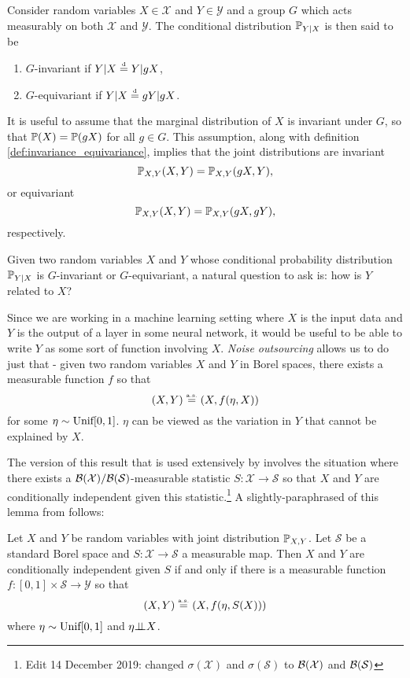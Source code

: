 \begin{definition} \label{def:invariance_equivariance}
Consider random variables $X \in \mathcal{X}$ and $Y \in \mathcal{Y}$ and a group $G$ which acts measurably on both $\mathcal{X}$ and $\mathcal{Y}$.
The conditional distribution $\mathbb{P}_{Y|X}$ is then said to be
\begin{enumerate} 
	\item $G$-invariant if $Y|X \stackrel{\text{\rm\tiny d}}{=} Y| gX$,
	\item $G$-equivariant if $Y|X \stackrel{\text{\rm\tiny d}}{=} gY | gX$.
\end{enumerate}
\end{definition}
It is useful to assume that the marginal distribution of $X$ is invariant under $G$, so that $\mathbb{P}(X) = \mathbb{P}(gX)$ for all $g \in G$.
This assumption, along with definition \ref{def:invariance_equivariance}, implies that the joint distributions are invariant
$$
	\mathbb{P}_{X,Y}(X,Y) = \mathbb{P}_{X,Y}(g X, Y),
$$
or equivariant
$$
	\mathbb{P}_{X,Y}(X,Y) = \mathbb{P}_{X,Y}(g X, g Y),
$$
respectively.

Given two random variables $X$ and $Y$ whose conditional probability distribution $\mathbb{P}_{Y|X}$ is $G$-invariant or $G$-equivariant, a natural question to ask is: how is $Y$ related to $X$?


Since we are working in a machine learning setting where $X$ is the input data and $Y$ is the output of a layer in some neural network, it would be useful to be able to write $Y$ as some sort of function involving $X$.
\textit{Noise outsourcing} allows us to do just that - given two random variables $X$ and $Y$ in Borel spaces, there exists a measurable function $f$ so that
$$
	(X,Y) \stackrel{\text{\rm\tiny a.s.}}{=} (X,f(\eta,X))
$$
for some $\eta \sim \text{\rm Unif}[0,1]$.
$\eta$ can be viewed as the variation in $Y$ that cannot be explained by $X$.

The version of this result that is used extensively by \cite{bloemreddy2019probabilistic} involves the situation where there exists a $\mathcal{B}(\mathcal{X})/\mathcal{B}(\mathcal{S})$-measurable statistic $S: \mathcal{X} \to \mathcal{S}$ so that $X$ and $Y$ are conditionally independent given this statistic.\footnote{Edit 14 December 2019: changed $\sigma(\mathcal{X})$ and $\sigma(\mathcal{S})$ to $\mathcal{B}(\mathcal{X})$ and $\mathcal{B}(\mathcal{S})$}%
A slightly-paraphrased of this lemma from \cite{bloemreddy2019probabilistic} follows:
\begin{lemma}
	Let $X$ and $Y$ be random variables with joint distribution $\mathbb{P}_{X,Y}$.
	Let $\mathcal{S}$ be a standard Borel space and $S: \mathcal{X} \to \mathcal{S}$ a measurable map.
	Then $X$ and $Y$ are conditionally independent given $S$ if and only if there is a measurable function $f: [0,1] \times \mathcal{S} \to \mathcal{Y}$ so that
	$$
		(X,Y) \stackrel{\text{\rm\tiny a.s.}}{=} (X,f(\eta,S(X)))
	$$
	where $\eta \sim \text{\rm Unif}[0,1]$ and $\eta {\perp\!\!\!\perp} X$.
\end{lemma}


